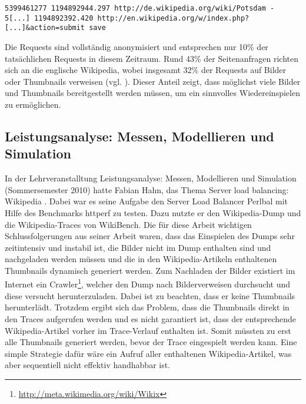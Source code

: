 \begin{small}
\begin{verbatim}
5399461277 1194892944.297 http://de.wikipedia.org/wiki/Potsdam -
5[...] 1194892392.420 http://en.wikipedia.org/w/index.php?[...]&action=submit save
\end{verbatim}
\end{small}



Die Requests sind vollständig anonymisiert und entsprechen nur 10\% der tatsächlichen Requests in diesem Zeitraum. Rund 43\% der Seitenanfragen richten sich an die englische Wikipedia, wobei insgesamt 32\% der Requests auf Bilder oder Thumbnails verweisen (vgl. \cite{wikianal}). Dieser Anteil zeigt, dass möglichst viele Bilder und Thumbnails bereitgestellt werden müssen, um ein sinnvolles Wiedereinspielen zu ermöglichen.

\subsection{Leistungsanalyse: Messen, Modellieren und Simulation}
\label{sec:mms}

In der Lehrveranstalltung \glqq{}Leistungsanalyse: Messen, Modellieren und Simulation\grqq{} (Sommersemester 2010) hatte Fabian Hahn, das Thema \glqq{}Server load balancing: Wikipedia\grqq{} \cite{mms}. Dabei war es seine Aufgabe den Server Load Balancer Perlbal mit Hilfe des Benchmarks httperf zu testen. Dazu nutzte er den Wikipedia-Dump und die Wikipedia-Traces von WikiBench. Die für diese Arbeit wichtigen Schlussfolgerungen aus seiner Arbeit waren, dass das Einspielen des Dumps sehr zeitintensiv und instabil ist, die Bilder nicht im Dump enthalten sind und nachgeladen werden müssen und die in den Wikipedia-Artikeln enthaltenen Thumbnails dynamisch generiert werden. Zum Nachladen der Bilder existiert im Internet ein Crawler\footnote{\url{http://meta.wikimedia.org/wiki/Wikix}}, welcher den Dump nach Bilderverweisen durchsucht und diese versucht herunterzuladen. Dabei ist zu beachten, dass er keine Thumbnails herunterlädt. Trotzdem ergibt sich das Problem, dass die Thumbnails direkt in den Traces aufgerufen werden und es nicht garantiert ist, dass der entsprechende Wikipedia-Artikel vorher im Trace-Verlauf enthalten ist. Somit müssten zu erst alle Thumbnails generiert werden, bevor der Trace eingespielt werden kann. Eine simple Strategie dafür wäre ein Aufruf aller enthaltenen Wikipedia-Artikel, was aber sequentiell nicht effektiv handhabbar ist.

